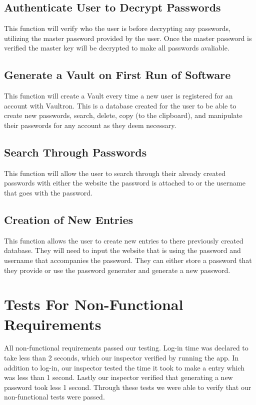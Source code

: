 \documentclass[11pt]{report}
\begin{document}
\subsection{Authenticate User to Decrypt Passwords}
This function will verify who the user is before decrypting any passwords, utilizing 
the master password provided by the user. Once the master password is verified
the master key will be decrypted to make all passwords avaliable.

\subsection{Generate a Vault on First Run of Software}
This function will create a Vault every time a new user is registered for an account 
with Vaultron. This is a database created for the user to be able to create new
passwords, search, delete, copy (to the clipboard), and manipulate their passwords
for any account as they deem necessary.

\subsection{Search Through Passwords}
This function will allow the user to search through their already created passwords
with either the website the password is attached to or the username that goes with 
the password. 

\subsection{Creation of New Entries}
This function allows the user to create new entries to there previously created 
database. They will need to input the website that is using the password and
username that accompanies the password.  They can either store a password that
they provide or use the password generater and generate a new password.




\section{Tests For Non-Functional Requirements}
All non-functional requirements passed our testing. Log-in time was declared to 
take less than 2 seconds, which our inspector verified by running the app. In 
addition to log-in, our inspector tested the time it took to make a entry which 
was less than 1 second. Lastly our inspector verified that generating a new 
password took less 1 second. Through these tests we were able to verify that our 
non-functional tests were passed.
\end{document}
